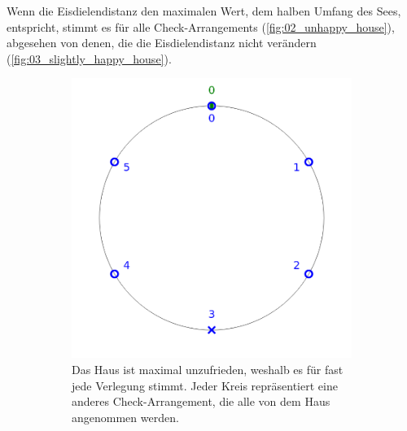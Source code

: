 \documentclass[a4paper,10pt,ngerman]{scrartcl}
\newcommand{\imageWidth}{0.3\linewidth}
\begin{document}
Wenn die Eisdielendistanz den maximalen Wert, dem halben Umfang des Sees, entspricht, stimmt es für alle Check-Arrangements (\autoref{fig:02_unhappy_house}), abgesehen von denen, die die Eisdielendistanz nicht verändern (\autoref{fig:03_slightly_happy_house}).
\begin{figure}[h!]
    \centering
    \caption{Unzufriedene Häuser}
    \begin{subfigure}[t]{\imageWidth}
        \includegraphics[width=\linewidth]{02_unhappy_house.png}
        \caption{Das Haus ist maximal unzufrieden, weshalb es für fast jede Verlegung stimmt. Jeder Kreis repräsentiert eine anderes Check-Arrangement, die alle von dem Haus angenommen werden.}
        \label{fig:02_unhappy_house}
    \end{subfigure}
    \begin{subfigure}[t]{\imageWidth}

\end{subfigure}
\end{figure}
\end{document}
